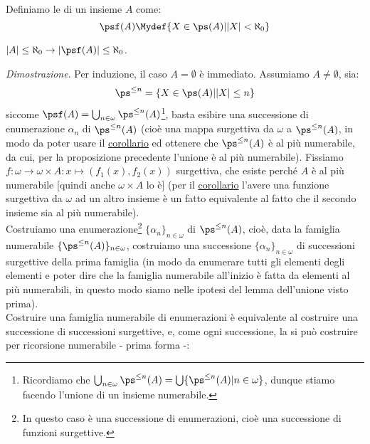 \documentclass[11pt]{scrartcl}
\begin{document}
\begin{definition}
	Definiamo le  di un insieme $A$ come:
	\[ \psf(A) \Mydef \{X \in \ps(A) | |X| < \aleph_0\}
		\]
\end{definition}

\begin{proposition}
	$|A| \leq \aleph_0 \rightarrow |\psf(A)| \leq \aleph_0$.
\end{proposition}

\hspace{-0.5cm}\emph{Dimostrazione}. Per induzione, il caso $A = \emptyset$ è immediato. Assumiamo $A \ne \emptyset$, sia:
	\[ \ps^{\leq n} = \{X \in \ps(A) | |X| \leq n\}
		\]
	siccome $\psf(A) = \bigcup_{n \in \omega} \ps^{\leq n}(A)$\footnote{Ricordiamo che $\bigcup_{n \in \omega} \ps^{\leq n}(A) = \bigcup\{\ps^{\leq n}(A) | n \in \omega\}$, dunque stiamo facendo l'unione di un insieme numerabile.}, basta esibire una successione di enumerazione $\alpha_n$ di $\ps^{\leq n}(A)$
	(cioè una mappa surgettiva da $\omega$ a $\ps^{\leq n}(A)$, in modo da poter usare il \hyperref[disugcardnum]{corollario} ed ottenere che $\ps^{\leq n}(A)$ è al più numerabile,
	da cui, per la proposizione precedente l'unione è al più numerabile).
	Fissiamo $f : \omega \rightarrow \omega \times A : x \mapsto (f_1(x),f_2(x))$ surgettiva, che esiste perché $A$ è al più numerabile [quindi anche $\omega \times A$ lo è] (per il \hyperref[disugcardnum]{corollario} l'avere una funzione surgettiva da $\omega$
	ad un altro insieme è un fatto equivalente al fatto che il secondo insieme sia al più numerabile).\\
	Costruiamo una enumerazione\footnote{In questo caso è una successione di enumerazioni, cioè una successione di funzioni surgettive.} $\{\alpha_n\}_{n \in \omega}$ di $\ps^{\leq n}(A)$, cioè, data la famiglia numerabile $\{\ps^{\leq n}(A)\}_{n \in \omega}$,
	costruiamo una successione $\{\alpha_n\}_{n \in \omega}$ di successioni surgettive della prima famiglia (in modo da enumerare tutti gli elementi degli elementi e poter dire che la famiglia numerabile all'inizio è fatta da elementi al più numerabili, in questo modo siamo nelle ipotesi del lemma
	dell'unione visto prima).\\
	Costruire una famiglia numerabile di enumerazioni è equivalente al costruire una successione di successioni surgettive, e, come ogni successione, la si può costruire per ricorsione numerabile - prima forma -:
\end{document}
